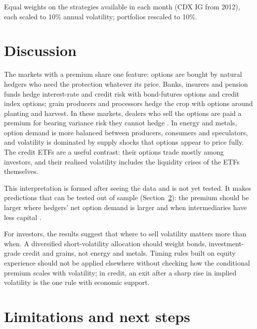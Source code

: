 \documentclass[11pt,a4paper]{article}
\theoremstyle{remark}
\newcommand{\note}[1]{\par\smallskip\parbox{\linewidth}{\footnotesize #1}}
\begin{document}
\begin{table}[H]
\centering
\caption{Equal-weighted portfolios of short-variance strategies}
\label{tab:portfolio}
\small

\note{Equal weights on the strategies available in each month (CDX IG from 2012), each scaled to 10\% annual volatility; portfolios rescaled to 10\%.}
\end{table}

\section{Discussion}
\label{sec:discussion}

The markets with a premium share one feature: options are bought by natural hedgers who need the protection whatever its price. Banks, insurers and pension funds hedge interest-rate and credit risk with bond-futures options and credit index options; grain producers and processors hedge the crop with options around planting and harvest. In these markets, dealers who sell the options are paid a premium for bearing variance risk they cannot hedge \citep{bollenwhaley2004,garleanu2009}. In energy and metals, option demand is more balanced between producers, consumers and speculators, and volatility is dominated by supply shocks that options appear to price fully. The credit ETFs are a useful contrast: their options trade mostly among investors, and their realised volatility includes the liquidity crises of the ETFs themselves.

This interpretation is formed after seeing the data and is not yet tested. It makes predictions that can be tested out of sample (Section~\ref{sec:next}): the premium should be larger where hedgers' net option demand is larger \citep{deroon2000} and when intermediaries have less capital \citep{hekellymanela2017}.

For investors, the results suggest that where to sell volatility matters more than when. A diversified short-volatility allocation should weight bonds, investment-grade credit and grains, not energy and metals. Timing rules built on equity experience should not be applied elsewhere without checking how the conditional premium scales with volatility; in credit, an exit after a sharp rise in implied volatility is the one rule with economic support.

\section{Limitations and next steps}
\label{sec:next}
\end{document}

